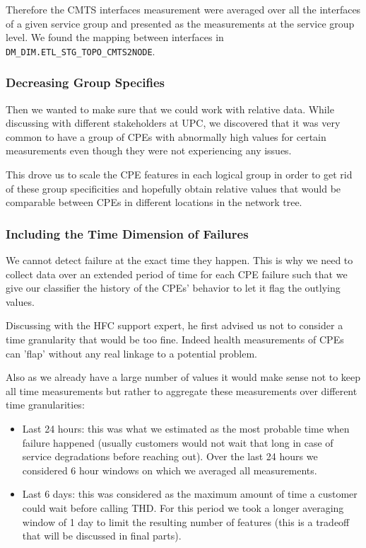 Therefore the CMTS interfaces measurement were averaged over all the interfaces of a given service group and presented as the measurements at the service group level. We found the mapping between interfaces in \texttt{DM\_DIM.ETL\_STG\_TOPO\_CMTS2NODE}.

\subsubsection{Decreasing Group Specifies}
Then we wanted to make sure that we could work with relative data. While discussing with different stakeholders at UPC, we discovered that it was very common to have a group of CPEs with abnormally high values for certain measurements even though they were not experiencing any issues.

This drove us to scale the CPE features in each logical group in order to get rid of these group specificities and hopefully obtain relative values that would be comparable between CPEs in different locations in the network tree. 

\subsubsection{Including the Time Dimension of Failures}
\label{subsubsec:time_representation}
We cannot detect failure at the exact time they happen. This is why we need to collect data over an extended period of time for each CPE failure such that we give our classifier the history of the CPEs' behavior to let it flag the outlying values. 

Discussing with the HFC support expert, he first advised us not to consider a time granularity that would be too fine. Indeed health measurements of CPEs can 'flap' without any real linkage to a potential problem. 

Also as we already have a large number of values it would make sense not to keep all time measurements but rather to aggregate these measurements over different time granularities:
\begin{itemize}
	\item Last 24 hours: this was what we estimated as the most probable time when failure happened (usually customers would not wait that long in case of service degradations before reaching out). Over the last 24 hours we considered 6 hour windows on which we averaged all measurements.
	\item Last 6 days: this was considered as the maximum amount of time a customer could wait before calling THD. For this period we took a longer averaging window of 1 day to limit the resulting number of features (this is a tradeoff that will be discussed in final parts).
\end{itemize}

